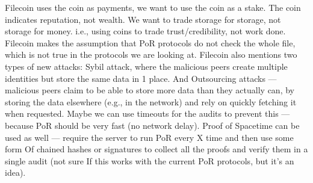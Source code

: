 Filecoin uses the coin as payments, we want to use the coin as a stake.
The coin indicates reputation, not wealth.
We want to trade storage for storage, not storage for money.
i.e., using coins to trade trust/credibility, not work done.
Filecoin makes the assumption that PoR protocols do not check the whole file,
which is not true in the protocols we are looking at.
Filecoin also mentions two types of new attacks:
Sybil attack, where the malicious peers create multiple identities but store the same data in 1 place.
And Outsourcing attacks --- malicious peers claim to be able to store more data than they actually can,
by storing the data elsewhere (e.g., in the network) and rely on quickly fetching it when requested.
Maybe we can use timeouts for the audits to prevent this --- because PoR should be very fast (no network delay).
Proof of Spacetime can be used as well --- require the server to run PoR every X time and then use some form Of
chained hashes or signatures to collect all the proofs and verify them in a single audit (not sure If
this works with the current PoR protocols, but it's an idea).
